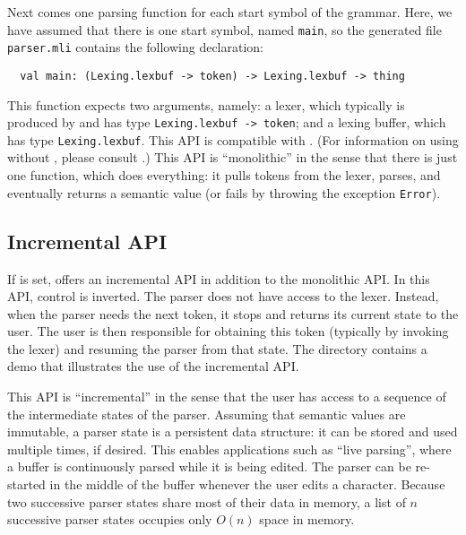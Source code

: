 \documentclass[onecolumn,11pt,nocopyrightspace,preprint]{sigplanconf}
\begin{document}

Next comes one parsing function for each start symbol of the grammar. Here, we
have assumed that there is one start symbol, named \verb+main+, so the
generated file \texttt{parser.mli} contains the following declaration:
\begin{verbatim}
  val main: (Lexing.lexbuf -> token) -> Lexing.lexbuf -> thing
\end{verbatim}
This function expects two arguments, namely: a lexer, which typically is produced by
\ocamllex and has type \verb+Lexing.lexbuf -> token+; and a lexing buffer,
which has type \verb+Lexing.lexbuf+. This API is compatible with
\ocamlyacc. (For information on using \menhir without \ocamllex, please
consult .)
%
This API is ``monolithic'' in the sense that there is just one function, which
does everything: it pulls tokens from the lexer, parses, and eventually
returns a semantic value (or fails by throwing the exception \texttt{Error}).



\subsection{Incremental API}
\label{sec:incremental}

If \otable is set, \menhir offers an incremental API in addition to the
monolithic API. In this API, control is inverted. The parser does not have
access to the lexer. Instead, when the parser needs the next token, it stops
and returns its current state to the user. The user is then responsible for
obtaining this token (typically by invoking the lexer) and resuming the parser
from that state.
%
The directory  contains a demo that
illustrates the use of the incremental API.

This API is ``incremental'' in the sense that the user has access to a
sequence of the intermediate states of the parser. Assuming that semantic
values are immutable, a parser state is a persistent data structure: it can be
stored and used multiple times, if desired. This enables applications such as
``live parsing'', where a buffer is continuously parsed while it is being
edited. The parser can be re-started in the middle of the buffer whenever the
user edits a character. Because two successive parser states share most of
their data in memory, a list of $n$ successive parser states occupies only
$O(n)$ space in memory.
\end{document}

